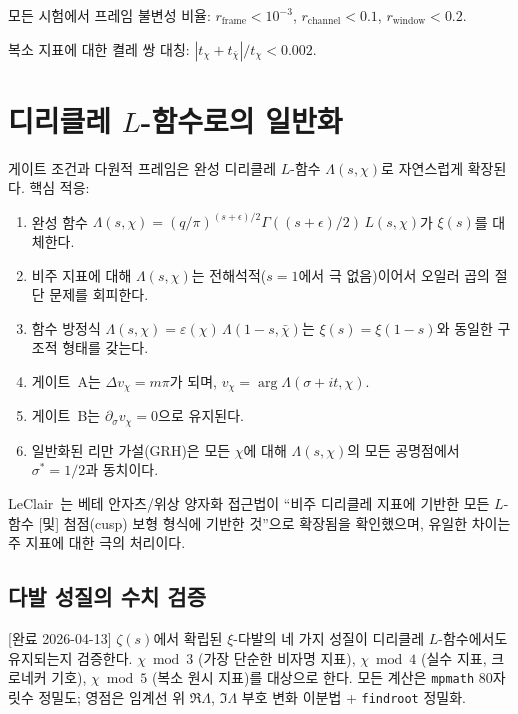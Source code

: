 \documentclass[11pt, a4paper]{article}
\theoremstyle{definition}
\theoremstyle{plain}
\newcommand{\xif}{\xi}
\begin{document}
모든 시험에서 프레임 불변성 비율:
$r_{\mathrm{frame}} < 10^{-3}$,
$r_{\mathrm{channel}} < 0.1$,
$r_{\mathrm{window}} < 0.2$.

복소 지표에 대한 켤레 쌍 대칭:
$|t_\chi + t_{\bar{\chi}}| / t_\chi < 0.002$.


\section{디리클레 $L$-함수로의 일반화}
\label{app:dirichlet}

게이트 조건과 다원적 프레임은 완성 디리클레 $L$-함수 $\Lambda(s,\chi)$로 자연스럽게 확장된다. 핵심 적응:

\begin{enumerate}
  \item 완성 함수 $\Lambda(s,\chi) = (q/\pi)^{(s+\epsilon)/2}
        \Gamma((s+\epsilon)/2)\,L(s,\chi)$가 $\xif(s)$를 대체한다.
  \item 비주 지표에 대해 $\Lambda(s,\chi)$는 전해석적($s=1$에서 극 없음)이어서 오일러 곱의 절단 문제를 회피한다.
  \item 함수 방정식 $\Lambda(s,\chi) = \varepsilon(\chi)\,
        \Lambda(1-s,\bar{\chi})$는 $\xif(s) = \xif(1-s)$와 동일한 구조적 형태를 갖는다.
  \item 게이트~A는 $\Delta v_\chi = m\pi$가 되며,
        $v_\chi = \arg\Lambda(\sigma+it,\chi)$.
  \item 게이트~B는 $\partial_\sigma v_\chi = 0$으로 유지된다.
  \item 일반화된 리만 가설(GRH)은 모든 $\chi$에 대해
        $\Lambda(s,\chi)$의 모든 공명점에서 $\sigma^* = 1/2$과 동치이다.
\end{enumerate}

LeClair~\cite{leclair2024}는 베테 안자츠/위상 양자화 접근법이 ``비주 디리클레 지표에 기반한 모든 $L$-함수 [및] 첨점(cusp) 보형 형식에 기반한 것''으로 확장됨을 확인했으며, 유일한 차이는 주 지표에 대한 극의 처리이다.

\subsection{다발 성질의 수치 검증}
\label{app:dirichlet:verify}

[완료 2026-04-13]
$\zeta(s)$에서 확립된 $\xi$-다발의 네 가지 성질이 디리클레 $L$-함수에서도 유지되는지 검증한다. $\chi\bmod 3$ (가장 단순한 비자명 지표), $\chi\bmod 4$ (실수 지표, 크로네커 기호), $\chi\bmod 5$ (복소 원시 지표)를 대상으로 한다. 모든 계산은 \texttt{mpmath} 80자릿수 정밀도; 영점은 임계선 위 $\Re\Lambda$, $\Im\Lambda$ 부호 변화 이분법 + \texttt{findroot} 정밀화.
\end{document}
